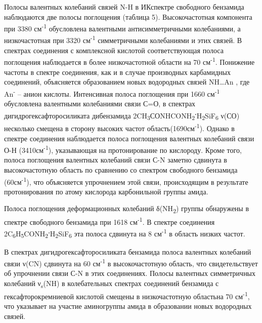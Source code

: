 \begin{multicols}{2}
Полосы валентных колебаний связей N-H в ИКспектре свободного бензамида
наблюдаются две полосы поглощения (таблица 5). Высокочастотная
компонента при 3380 см\textsuperscript{-1} обусловлена валентными
антисимметричными колебаниями, а низкочастотная при 3320
см\textsuperscript{-1} симметричными колебаниями и этих связей. В
спектрах соединения с комплексной кислотой соответствующая полоса
поглощения наблюдается в более низкочастотной области на 70
см\textsuperscript{-1}. Понижение частоты в спектре соединения, как и в
случае производных карбамидных соединений, объясняется образованием
новых водородных связей NH\ldots An , где An\textsuperscript{-} -- анион
кислоты. Интенсивная полоса поглощения при 1660 см\textsuperscript{-1}
обусловлена валентными колебаниями связи С=О, в спектрах
дигидрогексафторосиликата дибензамида
2CH\textsubscript{3}СОNHCONH\textsubscript{2}{\bfseries \textsuperscript{.}}H\textsubscript{2}SiF\textsubscript{6}
ν(СО) несколько смещена в сторону высоких частот
область(1690см\textsuperscript{-1}). Однако в спектре соединения
наблюдается полоса поглощения валентных колебаний связи О-Н
(3410см\textsuperscript{-1}), указывающая на протонирование по
кислороду. Кроме того, полоса поглощения валентных колебаний связи С-N
заметно сдвинута в высокочастотную область по сравнению со спектром
свободного бензамида (60см\textsuperscript{-1}), что объясняется
упрочнением этой связи, происходящим в результате протонирования по
атому кислорода карбонильной группы амида.

Полоса поглощения деформационных колебаний δ(NH\textsubscript{2}) группы
обнаружены в спектре свободного бензамида при 1618
см\textsuperscript{-1}. В спектре соединения
2C\textsubscript{6}H\textsubscript{5}CONH\textsubscript{2}{\bfseries \textsuperscript{.}}H\textsubscript{2}SiF\textsubscript{6}
эта полоса сдвинута на 8 см\textsuperscript{-1} в область низких частот.

В спектрах дигидрогексафторосиликата бензамида полоса валентных
колебаний связи ν(CN) сдвинута на 60 см\textsuperscript{-1} в
высокочастотную область, что свидетельствует об упрочнении связи С-N в
этих соединениях. Полосы валентных симметричных колебаний
ν\textsubscript{s}(NH) в колебательных спектрах соединений бензамида с
гексафторокремниевой кислотой смещены в низкочастотную областьна 70
см\textsuperscript{-1}, что указывает на участие аминогруппы амида в
образовании новых водородных связей.
\end{multicols}

